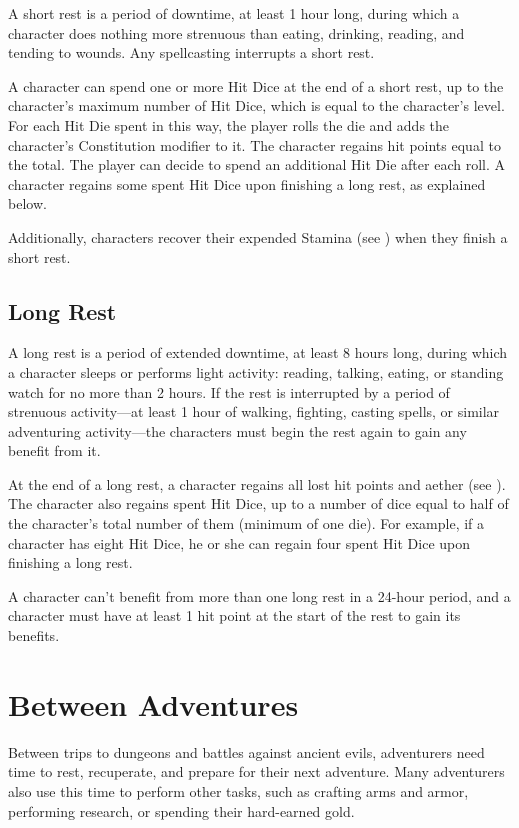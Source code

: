 A short rest is a period of downtime, at least 1 hour long, during which a character does nothing more strenuous than eating, drinking, reading, and tending to wounds. Any spellcasting interrupts a short rest.

A character can spend one or more Hit Dice at the end of a short rest, up to the character's maximum number of Hit Dice, which is equal to the character's level. For each Hit Die spent in this way, the player rolls the die and adds the character's Constitution modifier to it. The character regains hit points equal to the total. The player can decide to spend an additional Hit Die after each roll. A character regains some spent Hit Dice upon finishing a long rest, as explained below.

Additionally, characters recover their expended Stamina (see ) when they finish a short rest.

\subsection{Long Rest}

A long rest is a period of extended downtime, at least 8 hours long, during which a character sleeps or performs light activity: reading, talking, eating, or standing watch for no more than 2 hours. If the rest is interrupted by a period of strenuous activity—at least 1 hour of walking, fighting, casting spells, or similar adventuring activity—the characters must begin the rest again to gain any benefit from it.

At the end of a long rest, a character regains all lost hit points and aether (see ). The character also regains spent Hit Dice, up to a number of dice equal to half of the character's total number of them (minimum of one die). For example, if a character has eight Hit Dice, he or she can regain four spent Hit Dice upon finishing a long rest.

A character can't benefit from more than one long rest in a 24-hour period, and a character must have at least 1 hit point at the start of the rest to gain its benefits.

\section{Between Adventures}

Between trips to dungeons and battles against ancient evils, adventurers need time to rest, recuperate, and prepare for their next adventure. Many adventurers also use this time to perform other tasks, such as crafting arms and armor, performing research, or spending their hard-earned gold.

